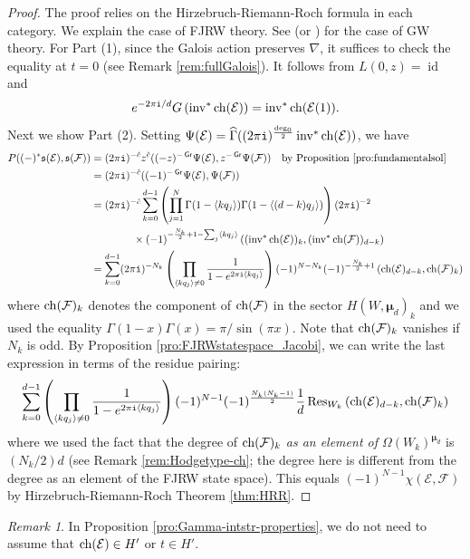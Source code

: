 \documentclass[11pt]{amsart}
\theoremstyle{definition} %
\theoremstyle{remark} %
\newtheorem{rem}[thm]{Remark}%
\newcommand{\id}{\operatorname{id}}
\newcommand{\Res}{\operatorname{Res}}
\newcommand{\ch}{{\rm ch}}
\def\fracp#1{\left\langle #1 \right\rangle}
\newcommand{\bmu}{\boldsymbol{\mu}}
\newcommand{\cE}{\mathcal{E}}
\newcommand{\cF}{\mathcal{F}}
\newcommand{\frs}{\mathfrak{s}}
\newcommand{\hc}{\hat{c}}
\newcommand{\grading}{\operatorname{\mathsf{Gr}}} %
\newcommand{\inv}{\operatorname{inv}}
\newcommand{\hGamma}{\widehat{\Gamma}}
\newcommand{\iu}{\mathtt{i}}
\begin{document}
\begin{proof} 
The proof relies on the Hirzebruch-Riemann-Roch formula 
in each category. 
We explain the case of FJRW theory. 
See \cite[Proposition 2.10]{Ir} 
(or \cite[Definition 3.6]{Iritani:period})  
for the case of GW theory. 
For Part (1), since the Galois action preserves 
$\nabla$, it suffices to check the equality at $t=0$ 
(see Remark \ref{rem:fullGalois}). 
It follows from $L(0,z) = \id$ 
and 
\[
e^{-2\pi\iu/d} G \left( \inv^* \ch(\cE)\right) 
= \inv^* \ch(\cE(1)).  
\]
Next we show Part (2). 
Setting $
\Psi(\cE) = \hGamma((2\pi\iu)^{\frac{\deg_0}{2}} 
 \inv^* \ch(\cE) )$, 
we have 
\begin{align*} 
P((-)^*\frs(\cE), \frs(\cF)) & = (2\pi\iu)^{-\hc} z^{\hc} 
((-z)^{-\grading} \Psi(\cE), z^{-\grading} \Psi(\cF)) 
\quad \text{by Proposition \ref{pro:fundamentalsol}} \\ 
& = (2\pi\iu)^{-\hc} 
( (-1)^{-\grading} \Psi(\cE), \Psi(\cF) ) \\ 
& = (2\pi\iu)^{-\hc} 
\sum_{k=0}^{d-1} 
\left( \prod_{j=1}^N 
\Gamma(1-\fracp{k q_j}) \Gamma(1- \fracp{(d-k)q_j})\right) 
(2\pi\iu)^{-2} \\ 
& \qquad \qquad \times 
(-1)^{-\frac{N_k}{2} +1 - \sum_{j} \fracp{kq_j}}
\left(
(\inv^* \ch(\cE))_k, (\inv^* \ch(\cF))_{d-k}\right) \\
& =  \sum_{k=0}^{d-1} (2\pi\iu)^{-N_k}
\left( \prod_{\fracp{kq_j}\neq 0} 
\frac{1}{1 - e^{2 \pi\iu \fracp{kq_j}}}
\right) (-1)^{N-N_k} (-1)^{-\frac{N_k}{2}+1}
\left(\ch(\cE)_{d-k}, \ch(\cF)_{k} \right) 
\end{align*} 
where $\ch(\cF)_k$ denotes the component of $\ch(\cF)$ 
in the sector $H(W,\bmu_d)_k$ and we used the 
equality $\Gamma(1-x) \Gamma(x) = \pi/\sin(\pi x)$. 
Note that $\ch(\cF)_k$ vanishes if $N_k$ is odd. 
By Proposition \ref{pro:FJRWstatespace_Jacobi}, we 
can write the last expression in terms of the residue pairing: 
\[
\sum_{k=0}^{d-1} 
\left( \prod_{\fracp{kq_j}\neq 0} 
\frac{1}{1 - e^{2 \pi\iu \fracp{kq_j}}}
\right) (-1)^{N-1} (-1)^{\frac{N_k(N_k-1)}{2}}
\frac{1}{d} 
\Res_{W_k}\left(\ch(\cE)_{d-k}, \ch(\cF)_{k} \right) 
\]
where we used the fact that the degree of $\ch(\cF)_k$ 
\emph{as an element of $\Omega(W_k)^{\bmu_d}$} is 
$(N_k/2) d$ (see Remark \ref{rem:Hodgetype-ch};  
the degree here is different from the degree 
as an element of the FJRW state space). 
This equals $(-1)^{N-1} \chi(\cE,\cF)$ by Hirzebruch-Riemann-Roch 
Theorem \ref{thm:HRR}. 
\end{proof} 
\begin{rem}
In Proposition \ref{pro:Gamma-intstr-properties}, 
we do not need to assume that $\ch(\cE) \in H'$ 
or $t\in H'$.  
\end{rem} 
\end{document}
